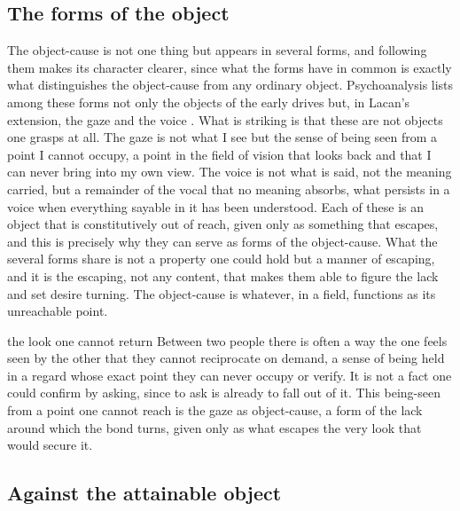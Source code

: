 \subsection*{The forms of the object}

The object-cause is not one thing but appears in several forms, and following them makes its character clearer, since what the forms have in common is exactly what distinguishes the object-cause from any ordinary object. Psychoanalysis lists among these forms not only the objects of the early drives but, in Lacan's extension, the gaze and the voice \parencite{lacan1977xi}. What is striking is that these are not objects one grasps at all. The gaze is not what I see but the sense of being seen from a point I cannot occupy, a point in the field of vision that looks back and that I can never bring into my own view. The voice is not what is said, not the meaning carried, but a remainder of the vocal that no meaning absorbs, what persists in a voice when everything sayable in it has been understood. Each of these is an object that is constitutively out of reach, given only as something that escapes, and this is precisely why they can serve as forms of the object-cause. What the several forms share is not a property one could hold but a manner of escaping, and it is the escaping, not any content, that makes them able to figure the lack and set desire turning. The object-cause is whatever, in a field, functions as its unreachable point.

\begin{casebox}{the look one cannot return}
Between two people there is often a way the one feels seen by the other that they cannot reciprocate on demand, a sense of being held in a regard whose exact point they can never occupy or verify. It is not a fact one could confirm by asking, since to ask is already to fall out of it. This being-seen from a point one cannot reach is the gaze as object-cause, a form of the lack around which the bond turns, given only as what escapes the very look that would secure it.
\end{casebox}

\subsection*{Against the attainable object}

